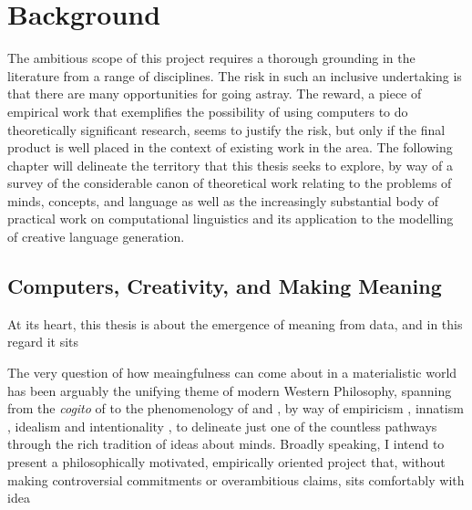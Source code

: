\chapter{Background}
The ambitious scope of this project requires a thorough grounding in the literature from a range of disciplines.  The risk in such an inclusive undertaking is that there are many opportunities for going astray.  The reward, a piece of empirical work that exemplifies the possibility of using computers to do theoretically significant research, seems to justify the risk, but only if the final product is well placed in the context of existing work in the area.  The following chapter will delineate the territory that this thesis seeks to explore, by way of a survey of the considerable canon of theoretical work relating to the problems of minds, concepts, and language as well as the increasingly substantial body of practical work on computational linguistics and its application to the modelling of creative language generation.

\section{Computers, Creativity, and Making Meaning}

At its heart, this thesis is about the emergence of meaning from data, and in this regard it sits

The very question of how meaingfulness can come about in a materialistic world has been arguably the unifying theme of modern Western Philosophy, spanning from the \emph{cogito} of \cite{Descartes} to the phenomenology of \cite{Husserl} and \cite{Heidegger}, by way of empiricism \citep{Locke,Hume}, innatism \citep{Kant}, idealism \citep{Hegel} and intentionality \citep{Bretano}, to delineate just one of the countless pathways through the rich tradition of ideas about minds.  Broadly speaking, I intend to present a philosophically motivated, empirically oriented project that, without making controversial commitments or overambitious claims, sits comfortably with  idea 

